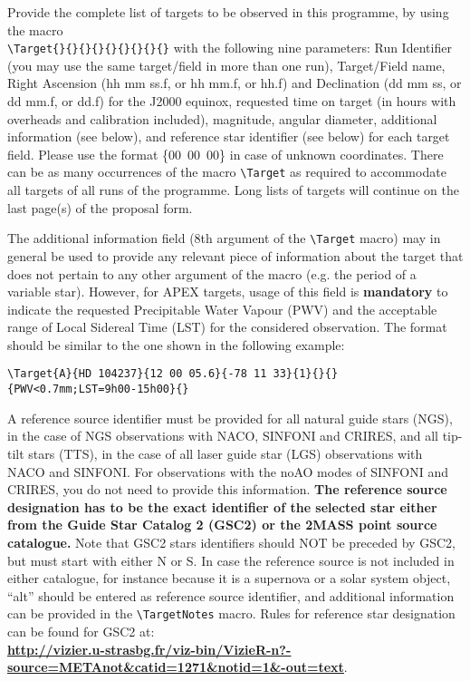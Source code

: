 \documentclass{article}
\begin{document}
Provide the complete list of targets to be observed in this programme,
by using the macro\\
\verb|\Target{}{}{}{}{}{}{}{}{}| 
with the following nine parameters: Run Identifier (you may use the same
target/field in more than one run), Target/Field name, Right Ascension
(hh mm ss.f, or hh mm.f, or hh.f) and Declination (dd mm ss, or dd
mm.f, or dd.f) for the 
J2000 equinox, requested time on target (in hours
with overheads and calibration included), magnitude, angular diameter,
additional information (see below), and reference star identifier
(see below)
for each target field.  Please use the format \{00~00~00\}
in case of unknown coordinates. There can be as many occurrences of
the macro \verb|\Target| as required to accommodate all targets of all
runs of the programme. Long lists of targets will continue
on the last page(s) of the proposal form.

The additional information field (8th argument of the \verb|\Target|
macro) may in general be used to provide any relevant piece of
information about the target that does not pertain to any other
argument of the macro (e.g. the period of a variable star). However,
for APEX targets, usage of this field is {\bf mandatory} to indicate the
requested Precipitable Water Vapour (PWV) and the acceptable range of
Local Sidereal Time (LST) for the considered observation. The format
should be similar to the one shown in the following example:
\begin{verbatim}
\Target{A}{HD 104237}{12 00 05.6}{-78 11 33}{1}{}{}{PWV<0.7mm;LST=9h00-15h00}{}
\end{verbatim}

A reference source identifier must be provided for all natural guide stars
(NGS), in the case of NGS observations with NACO, SINFONI and CRIRES,
and all tip-tilt stars (TTS), in the case of all laser guide star (LGS)
observations with NACO 
and SINFONI. For observations with the noAO modes of SINFONI and
CRIRES, you do
not need to provide this information.  {\bf The reference source
  designation has to be the exact identifier of the selected star
  either 
  from the Guide Star Catalog 2 (GSC2) or the 2MASS point source
  catalogue.} Note that GSC2 stars identifiers should NOT be preceded
by GSC2, 
but must start with either N or S. In case the reference source is not
included in either catalogue, for instance because it is a supernova or
a solar system object, ``alt'' should be entered as reference source
identifier, and additional information can be provided in the
\verb|\TargetNotes| macro.
Rules for reference star designation can be found for GSC2 at:\\
  \href{http://vizier.u-strasbg.fr/viz-bin/VizieR-n?-source=METAnot&catid=1271&notid=1&-out=text}{\bf
    \underline{http://vizier.u-strasbg.fr/viz-bin/VizieR-n?-source=METAnot\&catid=1271\&notid=1\&-out=text}}. 
\end{document}
